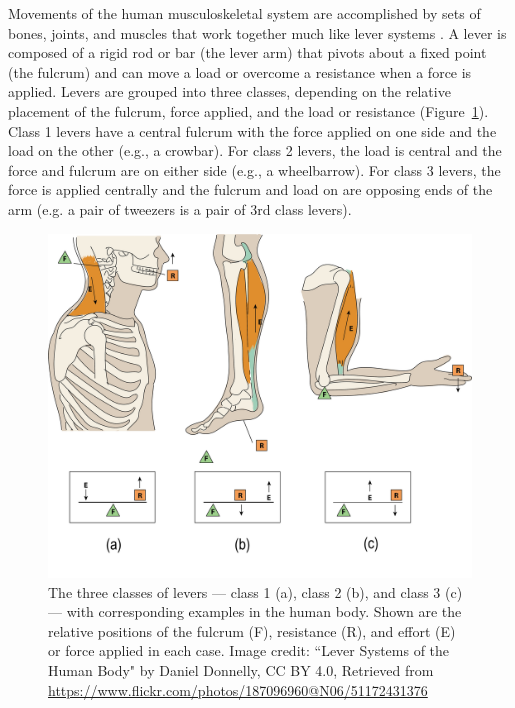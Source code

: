 \documentclass{article}
\begin{document}
Movements of the human musculoskeletal system are accomplished by sets of bones, joints, and muscles that work together much like lever systems \citep{leversOLI, guyton2016book, openStax_lever}. A lever is composed of a rigid rod or bar (the lever arm) that pivots about a fixed point (the fulcrum) and can move a load or overcome a resistance when a force is applied. Levers are grouped into three classes, depending on the relative placement of the fulcrum, force applied, and the load or resistance (Figure~\ref{aJ1WcQA5XW}). Class 1 levers have a central fulcrum with the force applied on one side and the load on the other (e.g., a crowbar). For class 2 levers, the load is central and the force and fulcrum are on either side (e.g., a wheelbarrow). For class 3 levers, the force is applied centrally and the fulcrum and load on are opposing ends of the arm (e.g. a pair of tweezers is a pair of 3rd class levers).

\begin{figure}[!htbp]
\centering
\includegraphics[width=0.8\linewidth]{files/EPpXta8zJdzN048lz8AR-1ee2a83b2dad049c6fbf527952ab81a1.png}
\caption[]{The three classes of levers --- class 1 (a), class 2 (b), and class 3 (c) --- with corresponding examples in the human body. Shown are the relative positions of the fulcrum (F), resistance (R), and effort (E) or force applied in each case. Image credit: ``Lever Systems of the Human Body" by Daniel Donnelly, CC BY 4.0, Retrieved from \href{https://www.flickr.com/photos/187096960@N06/51172431376}{https://www.flickr.com/photos/187096960@N06/51172431376}}
\label{aJ1WcQA5XW}
\end{figure}
\end{document}
